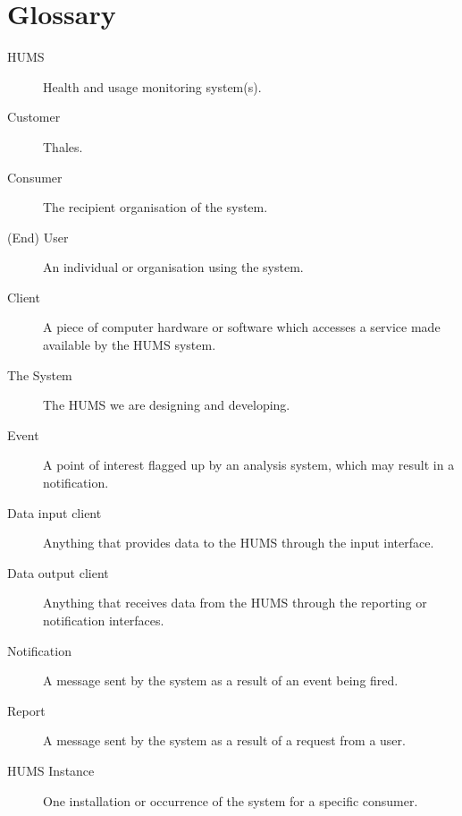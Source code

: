 \documentclass[10pt,a4paper]{article}
\begin{document}
\section{Glossary}

\begin{description}

	\item[HUMS] Health and usage monitoring system(s).
	\item[Customer] Thales. 
	\item[Consumer] The recipient organisation of the system.
	\item[(End) User] An individual or organisation using the system.
	\item[Client] A piece of computer hardware or software which accesses a
	              service made available by the HUMS system.
	\item[The System] The HUMS we are designing and developing.
	\item[Event] A point of interest flagged up by an analysis system, which
	             may result in a notification.
	\item[Data input client] Anything that provides data to the HUMS through
	                         the input interface.
	\item[Data output client] Anything that receives data from the HUMS
	                          through the reporting or notification interfaces.
	\item[Notification] A message sent by the system as a result of an event
	                    being fired.
	\item[Report] A message sent by the system as a result of a request from a
	              user. 
	\item[HUMS Instance] One installation or occurrence of the system for a
	                     specific consumer.
\end{description}
\pagebreak


\end{document}
